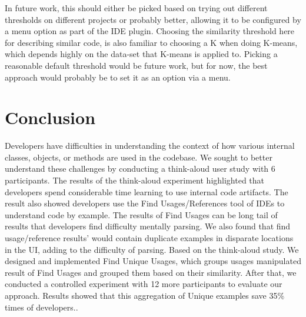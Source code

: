 \documentclass[conference]{IEEEtran}
\begin{document}
In future work, this should either be picked based on trying out different thresholds on different projects or probably better, allowing it to be configured by a menu option as part of the IDE plugin. Choosing the similarity threshold here for describing similar code, is also familiar to choosing a K when doing K-means, which depends highly on the data-set that K-means is applied to. Picking a reasonable default threshold would be future work, but for now, the best approach would probably be to set it as an option via a menu.

\section{Conclusion}
Developers have difficulties in understanding the context of how various internal classes, objects, or methods are used in the codebase. We sought to better understand these challenges by conducting a think-aloud user study with 6 participants. The results of the think-aloud experiment highlighted that developers spend considerable time learning to use internal code artifacts. The result also showed developers use the Find Usages/References tool of IDEs to understand code by example. The results of Find Usages can be long tail of results that developers find difficulty mentally parsing. We also found that find usage/reference results' would contain duplicate examples in disparate locations in the UI, adding to the difficulty of parsing. Based on the think-aloud study. We designed and implemented Find Unique Usages, which groups usages  manipulated result of Find Usages and grouped them based on their similarity. After that, we conducted a controlled experiment with 12 more participants to evaluate our approach. Results showed that this aggregation of Unique examples save 35\% times of developers..





\end{document}
